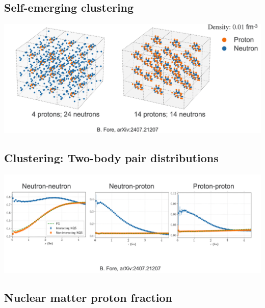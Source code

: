 \documentclass[%
oneside,                 %
final,                   %
10pt]{article}
\begin{document}
\vspace{6mm}

\subsection{Self-emerging clustering}

\vspace{6mm}

\centerline{\includegraphics[width=1.0\linewidth]{figures/mbpfig7.png}}

\vspace{6mm}

\subsection{Clustering: Two-body pair distributions}

\vspace{6mm}

\centerline{\includegraphics[width=1.0\linewidth]{figures/mbpfig8.png}}

\vspace{6mm}

\subsection{Nuclear matter proton fraction}

\vspace{6mm}
\end{document}
